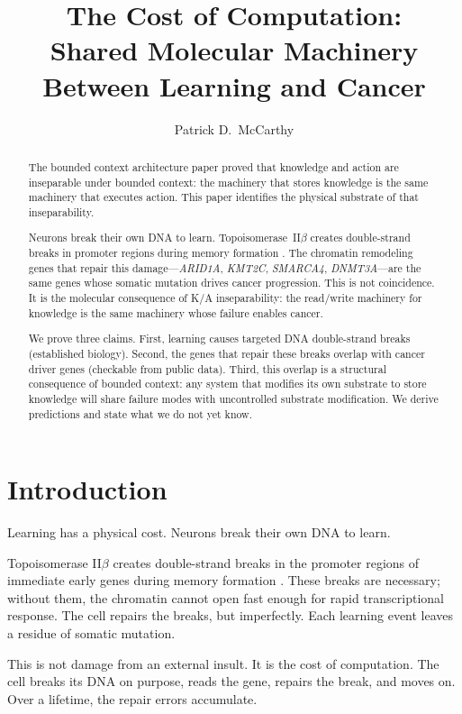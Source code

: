 \documentclass[11pt]{article}
\title{The Cost of Computation:\\Shared Molecular Machinery Between Learning and Cancer}
\author{Patrick D.\ McCarthy}
\date{}
\theoremstyle{definition}
\begin{document}
\maketitle

\begin{abstract}
The bounded context architecture paper proved that knowledge and action are
inseparable under bounded context: the machinery that stores
knowledge is the same machinery that executes action. This paper
identifies the physical substrate of that inseparability.

Neurons break their own DNA to learn. Topoisomerase~II$\beta$
creates double-strand breaks in promoter regions during memory
formation \cite{Madabhushi2015}. The chromatin remodeling genes
that repair this damage---\emph{ARID1A}, \emph{KMT2C},
\emph{SMARCA4}, \emph{DNMT3A}---are the same genes whose somatic
mutation drives cancer progression. This is not coincidence. It is
the molecular consequence of K/A inseparability: the read/write
machinery for knowledge is the same machinery whose failure
enables cancer.

We prove three claims. First, learning causes targeted DNA
double-strand breaks (established biology). Second, the genes that
repair these breaks overlap with cancer driver genes (checkable
from public data). Third, this overlap is a structural consequence
of bounded context: any system that modifies its own substrate to
store knowledge will share failure modes with uncontrolled
substrate modification. We derive predictions and state what we do
not yet know.
\end{abstract}

\section{Introduction}
\label{sec:intro}

Learning has a physical cost. Neurons break their own DNA to learn.

Topoisomerase II$\beta$ creates double-strand breaks in the promoter
regions of immediate early genes during memory formation
\cite{Madabhushi2015}. These breaks are necessary; without them,
the chromatin cannot open fast enough for rapid transcriptional
response. The cell repairs the breaks, but imperfectly.
Each learning event leaves a residue of somatic mutation.

This is not damage from an external insult. It is the cost of
computation. The cell breaks its DNA on purpose, reads the gene,
repairs the break, and moves on. Over a lifetime, the repair
errors accumulate.
\end{document}
